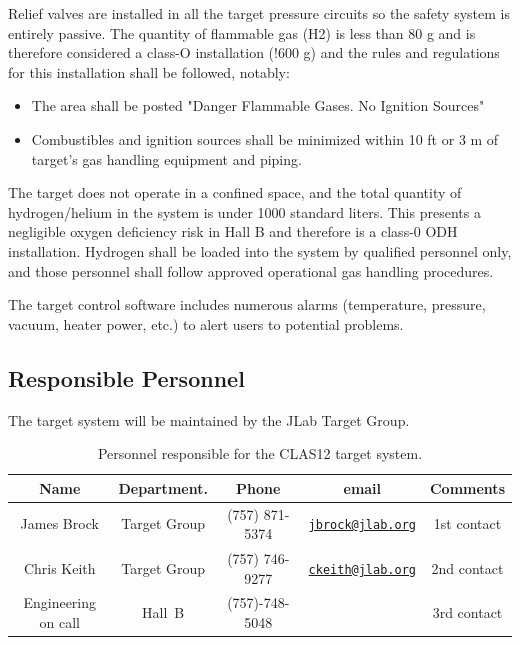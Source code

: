Relief valves are installed in all the target pressure circuits so the safety system is entirely passive.  The quantity of flammable gas (H2) is less than 80 g and is therefore considered a class-O installation (!600 g) and the rules and regulations for this installation shall be followed, notably:

\begin{itemize}
\item The area shall be posted "Danger Flammable Gases. No Ignition Sources" 
\item Combustibles and ignition sources shall be minimized within 10 ft or 3 m of target’s gas handling equipment and piping.
\end{itemize}

The target does not operate in a confined space, and the total quantity of hydrogen/helium in the system is under 1000 standard liters. This presents a negligible oxygen deficiency risk in Hall B and therefore is a class-0 ODH installation.  Hydrogen shall be loaded into the system by qualified personnel only, and those personnel shall follow approved operational gas handling procedures.

The target control software includes numerous alarms (temperature, pressure, vacuum, heater power, etc.) to alert users to potential problems.

\subsection{Responsible Personnel}

The target system will be maintained by the JLab Target Group.  

\begin{table}[!htb]
\centering
\begin{tabular}{|c|c|c|c|c|}
\hline
 Name&Department.&Phone&email&Comments \\ \hline
James Brock & Target Group &(757) 871-5374&\href{mailto:jbrock@jlab.org}{\nolinkurl{jbrock@jlab.org}} &1st contact \\ \hline
Chris Keith & Target Group &(757) 746-9277&\href{mailto:ckeith@jlab.org}{\nolinkurl{ckeith@jlab.org}}  &2nd contact \\ \hline
Engineering on call & Hall~B&(757)-748-5048&& 3rd contact  \\ \hline
\end{tabular}
\caption{Personnel responsible for the CLAS12 target system.} 
\label{tb:target}
\end{table}
